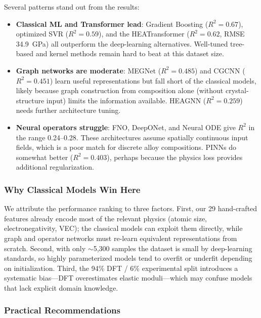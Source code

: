 \documentclass[11pt,a4paper]{article}
\begin{document}
Several patterns stand out from the results:

\begin{itemize}
  \item \textbf{Classical ML and Transformer lead}: Gradient Boosting ($R^2=0.67$), optimized SVR ($R^2=0.59$), and the HEATransformer ($R^2=0.62$, RMSE 34.9~GPa) all outperform the deep-learning alternatives. Well-tuned tree-based and kernel methods remain hard to beat at this dataset size.

  \item \textbf{Graph networks are moderate}: MEGNet ($R^2=0.485$) and CGCNN ($R^2=0.451$) learn useful representations but fall short of the classical models, likely because graph construction from composition alone (without crystal-structure input) limits the information available. HEAGNN ($R^2=0.259$) needs further architecture tuning.

  \item \textbf{Neural operators struggle}: FNO, DeepONet, and Neural ODE give $R^2$ in the range 0.24--0.28. These architectures assume spatially continuous input fields, which is a poor match for discrete alloy compositions. PINNs do somewhat better ($R^2=0.403$), perhaps because the physics loss provides additional regularization.
\end{itemize}

\subsubsection{Why Classical Models Win Here}

We attribute the performance ranking to three factors.  First, our 29 hand-crafted features already encode most of the relevant physics (atomic size, electronegativity, VEC); the classical models can exploit them directly, while graph and operator networks must re-learn equivalent representations from scratch.  Second, with only $\sim$5{,}300 samples the dataset is small by deep-learning standards, so highly parameterized models tend to overfit or underfit depending on initialization.  Third, the 94\% DFT / 6\% experimental split introduces a systematic bias---DFT overestimates elastic moduli---which may confuse models that lack explicit domain knowledge.

\subsubsection{Practical Recommendations}
\end{document}
